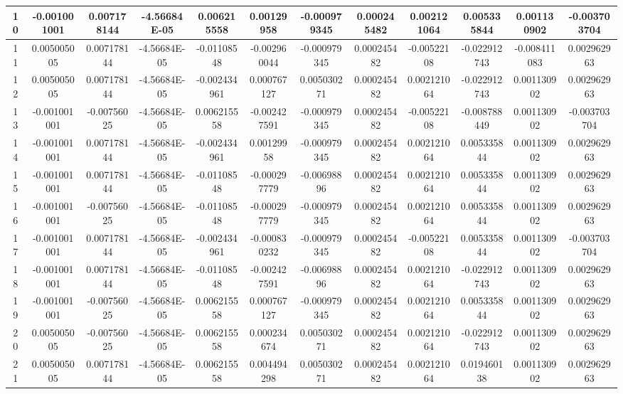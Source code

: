 \documentclass[UTF8]{ctexart}
\begin{document}
\begin{itemize}
\begin{table}[!ht]
{{\begin{tabular}{|c|c|c|c|c|c|c|c|c|c|c|c|}
					      10     & -0.001001001 & 0.007178144 & -4.56684E-05 & 0.006215558  & 0.00129958   & -0.000979345 & 0.000245482   & 0.002121064  & 0.005335844  & 0.001130902  & -0.003703704 \\ \hline
					      11     & 0.005005005  & 0.007178144 & -4.56684E-05 & -0.01108548  & -0.002960044 & -0.000979345 & 0.000245482   & -0.00522108  & -0.022912743 & -0.008411083 & 0.002962963  \\ \hline
					      12     & 0.005005005  & 0.007178144 & -4.56684E-05 & -0.002434961 & 0.000767127  & 0.005030271  & 0.000245482   & 0.002121064  & -0.022912743 & 0.001130902  & 0.002962963  \\ \hline
					      13     & -0.001001001 & -0.00756025 & -4.56684E-05 & 0.006215558  & -0.002427591 & -0.000979345 & 0.000245482   & -0.00522108  & -0.008788449 & 0.001130902  & -0.003703704 \\ \hline
					      14     & -0.001001001 & 0.007178144 & -4.56684E-05 & -0.002434961 & 0.00129958   & -0.000979345 & 0.000245482   & 0.002121064  & 0.005335844  & 0.001130902  & 0.002962963  \\ \hline
					      15     & -0.001001001 & 0.007178144 & -4.56684E-05 & -0.01108548  & -0.000297779 & -0.00698896  & 0.000245482   & 0.002121064  & 0.005335844  & 0.001130902  & 0.002962963  \\ \hline
					      16     & -0.001001001 & -0.00756025 & -4.56684E-05 & -0.01108548  & -0.000297779 & -0.000979345 & 0.000245482   & 0.002121064  & 0.005335844  & 0.001130902  & 0.002962963  \\ \hline
					      17     & -0.001001001 & 0.007178144 & -4.56684E-05 & -0.002434961 & -0.000830232 & -0.000979345 & 0.000245482   & -0.00522108  & 0.005335844  & 0.001130902  & -0.003703704 \\ \hline
					      18     & -0.001001001 & 0.007178144 & -4.56684E-05 & -0.01108548  & -0.002427591 & -0.00698896  & 0.000245482   & 0.002121064  & -0.022912743 & 0.001130902  & 0.002962963  \\ \hline
					      19     & -0.001001001 & -0.00756025 & -4.56684E-05 & 0.006215558  & 0.000767127  & -0.000979345 & 0.000245482   & 0.002121064  & 0.005335844  & 0.001130902  & 0.002962963  \\ \hline
					      20     & 0.005005005  & -0.00756025 & -4.56684E-05 & 0.006215558  & 0.000234674  & 0.005030271  & 0.000245482   & 0.002121064  & -0.022912743 & 0.001130902  & 0.002962963  \\ \hline
					      21     & 0.005005005  & 0.007178144 & -4.56684E-05 & 0.006215558  & 0.004494298  & 0.005030271  & 0.000245482   & 0.002121064  & 0.019460138  & 0.001130902  & 0.002962963  \\ \hline

\end{tabular}}}
\end{table}
\end{itemize}
\end{document}
